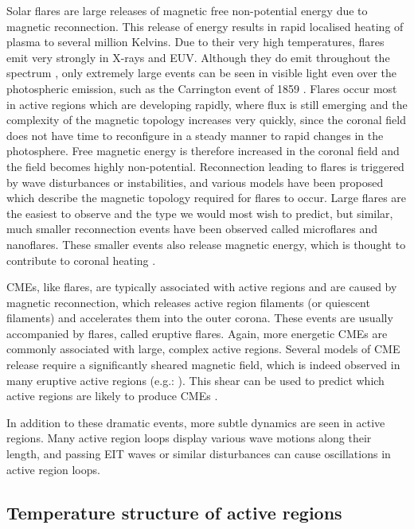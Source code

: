 \documentclass{article}
\begin{document}
Solar flares are large releases of magnetic free non-potential energy
due to magnetic reconnection. This release of energy results in rapid
localised heating of plasma to several million Kelvins. Due to their
very high temperatures, flares emit very strongly in X-rays and EUV.
Although they do emit throughout the spectrum \citep{Fletcher2011},
only extremely large events can be seen in visible light even over
the photospheric emission, such as the Carrington event of 1859 \citep{Carrington1859}.
Flares occur most in active regions which are developing rapidly,
where flux is still emerging and the complexity of the magnetic topology
increases very quickly, since the coronal field does not have time
to reconfigure in a steady manner to rapid changes in the photosphere.
Free magnetic energy is therefore increased in the coronal field and
the field becomes highly non-potential. Reconnection leading to flares
is triggered by wave disturbances or instabilities, and various models
have been proposed which describe the magnetic topology required for
flares to occur. Large flares are the easiest to observe and the type
we would most wish to predict, but similar, much smaller reconnection
events have been observed called microflares and nanoflares. These
smaller events also release magnetic energy, which is thought to contribute
to coronal heating .

CMEs, like flares, are typically associated with active regions and
are caused by magnetic reconnection, which releases active region
filaments (or quiescent filaments) and accelerates them into the outer
corona. These events are usually accompanied by flares, called eruptive
flares. Again, more energetic CMEs are commonly associated with large,
complex active regions. Several models of CME release require a significantly
sheared magnetic field, which is indeed observed in many eruptive
active regions (e.g.: \citet{Chen2015,Thompson2011,Kliem2012}). This
shear can be used to predict which active regions are likely to produce
CMEs \citep{Falconer2002}.

In addition to these dramatic events, more subtle dynamics are seen
in active regions. Many active region loops display various wave motions
along their length, and passing EIT waves or similar disturbances
can cause oscillations in active region loops.


\subsection{Temperature structure of active regions}
\end{document}
